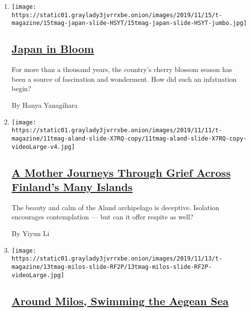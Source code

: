 \begin{enumerate}
\def\labelenumi{\arabic{enumi}.}
\item
  \texttt{[image: https://static01.graylady3jvrrxbe.onion/images/2019/11/15/t-magazine/15tmag-japan-slide-HSYT/15tmag-japan-slide-HSYT-jumbo.jpg]}

  \hypertarget{japan-in-bloom}{%
  \subsection{\texorpdfstring{\href{/2019/11/15/t-magazine/japan-cherry-blossoms.html}{Japan
  in Bloom}}{Japan in Bloom}}\label{japan-in-bloom}}

  For more than a thousand years, the country's cherry blossom season
  has been a source of fascination and wonderment. How did such an
  infatuation begin?

  By Hanya Yanagihara
\item
  \texttt{[image: https://static01.graylady3jvrrxbe.onion/images/2019/11/11/t-magazine/11tmag-aland-slide-X7RQ-copy/11tmag-aland-slide-X7RQ-copy-videoLarge-v4.jpg]}

  \hypertarget{a-mother-journeys-through-grief-across-finlands-many-islands}{%
  \subsection{\texorpdfstring{\href{/2019/11/12/t-magazine/mother-loses-son-travel-coping.html}{A
  Mother Journeys Through Grief Across Finland's Many
  Islands}}{A Mother Journeys Through Grief Across Finland's Many Islands}}\label{a-mother-journeys-through-grief-across-finlands-many-islands}}

  The beauty and calm of the Aland archipelago is deceptive. Isolation
  encourages contemplation --- but can it offer respite as well?

  By Yiyun Li
\item
  \texttt{[image: https://static01.graylady3jvrrxbe.onion/images/2019/11/13/t-magazine/13tmag-milos-slide-RF2P/13tmag-milos-slide-RF2P-videoLarge.jpg]}

  \hypertarget{around-milos-swimming-the-aegean-sea}{%
  \subsection{\texorpdfstring{\href{/2019/11/14/t-magazine/milos-greece-swimming.html}{Around
  Milos, Swimming the Aegean
  Sea}}{Around Milos, Swimming the Aegean Sea}}\label{around-milos-swimming-the-aegean-sea}}


\end{enumerate}
